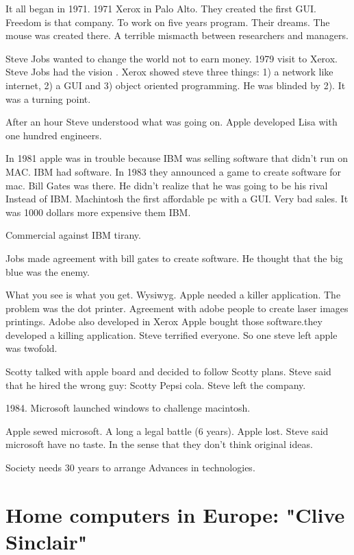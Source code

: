  It all began in 1971. 
  1971 Xerox in Palo Alto. They created the first GUI. Freedom is that company. To work on five years program. Their dreams. The mouse was 
  created there. A terrible mismacth between researchers and managers. 
  
  Steve Jobs wanted to change the world not to earn money. 1979 visit to Xerox. 
  Steve Jobs had the vision . Xerox showed steve three things: 1) a network like internet, 2) a GUI and  3) object oriented programming. He 
  was blinded by 2). It was a turning point. 
  
  After an hour Steve understood what was going on. Apple developed Lisa with one hundred engineers. 
  
  In 1981 apple was in trouble because IBM was selling software that didn't run on MAC. IBM had software. In 1983 they announced a game to 
  create software for mac. Bill Gates was there. He didn't realize that he was going to be his rival Instead of IBM. Machintosh the first 
  affordable pc with a GUI. Very bad sales. It was 1000 dollars more expensive them IBM. 
  
  Commercial against IBM tirany. 
  
  Jobs made agreement with bill gates to create software. He thought that the big blue was the enemy. 
  
  
  What you see is what you get. 
  Wysiwyg. Apple needed a killer application. 
  The problem was the dot printer. Agreement with adobe people to create laser images printings. 
  Adobe also developed in Xerox 
  Apple bought those software.they developed a killing application. Steve terrified everyone. So one steve left apple was twofold. 
  
  Scotty talked with apple board and decided to follow Scotty plans. 
  Steve said that he hired the wrong guy: Scotty Pepsi cola.  Steve left the company. 
  
  1984. Microsoft launched windows to challenge macintosh.  
  
  Apple sewed microsoft. A long a legal battle (6 years). 
   Apple lost. 
  Steve said microsoft have no taste. 
  In the sense that they don't think original ideas. 
  
  Society needs 30 years to arrange Advances in technologies. 
  
  
  
   
   \section{Home computers in Europe: "Clive Sinclair"} 
   
